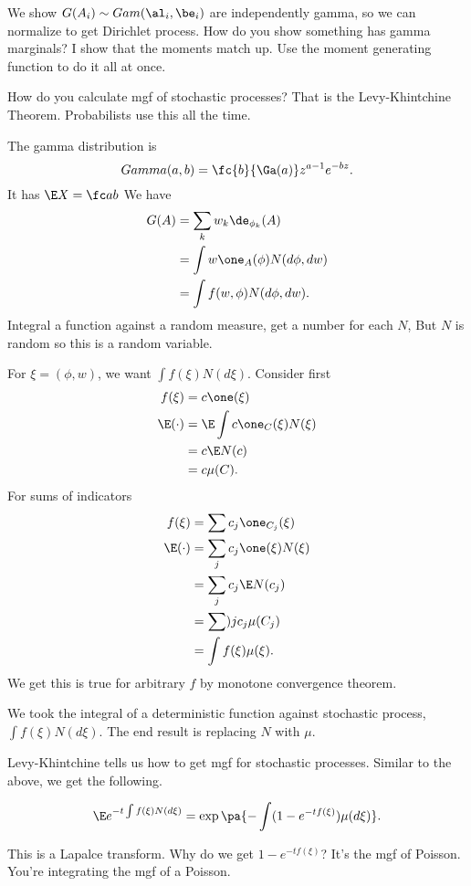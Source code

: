 We show
$G(A_i)\sim Gam(\al_i,\be_i)$ are independently gamma, so %
we can normalize to get Dirichlet process.
How do you show something has gamma marginals?
I show that the moments match up. Use the moment generating function to do it all at once.

How do you calculate mgf of stochastic processes? That is the Levy-Khintchine Theorem.
Probabilists use this all the time.

The gamma distribution is
$$Gamma(a,b) = \fc{b}{\Ga(a)}z^{a-1} e^{-bz}.$$
It has $\E X = \fc ab$
We have
\begin{align}
G(A) & = \sum_k w_k \de_{\phi_k}(A)\\
&=\int w \one_A(\phi) N(d\phi,dw)\\
&= \int f(w,\phi) N(d\phi, dw).
\end{align}
Integral a function against a random measure, get a number for each $N$, But $N$ is random so this is a random variable.

For $\xi = (\phi, w)$, we want $\int f(\xi) N(d\xi)$. Consider first 
\begin{align}
f(\xi) & = c\one (\xi)\\
\E(\cdot) &= \E\int c \one_C(\xi) N(\xi)\\
&= c\E N(c)\\
&=c \mu(C).
\end{align}
For sums of indicators
\begin{align}
f(\xi) &= \sum c_j \one_{C_j} (\xi)\\
\E (\cdot) &= \sum_j c_j  \one(\xi) N(\xi)\\
&=\sum_j c_j \E N(c_j)\\
&=\sum)j c_j \mu(C_j)\\
&=\int f(\xi)\mu(\xi).
\end{align}
We get this is true for arbitrary $f$ by monotone convergence theorem.

We took the integral  of a deterministic function against stochastic process, $\int f(\xi) N(d\xi)$. The end result is replacing $N$ with $\mu$. 


Levy-Khintchine tells us how to get mgf for stochastic processes. Similar to the above, we get the following.
\begin{thm}
$$
\E e^{-t\int f(\xi) N(d\xi)} = 
\exp\pa{-\int (1-e^{-tf(\xi)})\mu(d\xi)}.
$$
\end{thm}
This is a Lapalce transform. Why do we get $1-e^{-t f(\xi)}$? It's the mgf of Poisson.  %
You're integrating the mgf of a Poisson.

